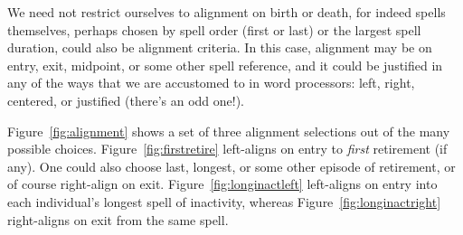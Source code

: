 \documentclass{article}
\begin{document}
We need not restrict ourselves to alignment on birth or death, for indeed spells
themselves, perhaps chosen by spell order (first or last) or the largest spell
duration, could also be alignment criteria. In this case, alignment may be on
entry, exit, midpoint, or some other spell reference, and it could be justified
in any of the ways that we are accustomed to in word processors: left, right,
centered, or justified (there's an odd one!).

Figure~\ref{fig:alignment} shows a set of three alignment selections out of the
many possible choices. Figure~\ref{fig:firstretire} left-aligns on
entry to \emph{first} retirement (if any). One could also choose last, longest,
or some other episode of retirement, or of course right-align on exit.
Figure~\ref{fig:longinactleft} left-aligns on entry into each individual's
longest spell of inactivity, whereas Figure~\ref{fig:longinactright} right-aligns on exit from
the same spell.
\end{document}
